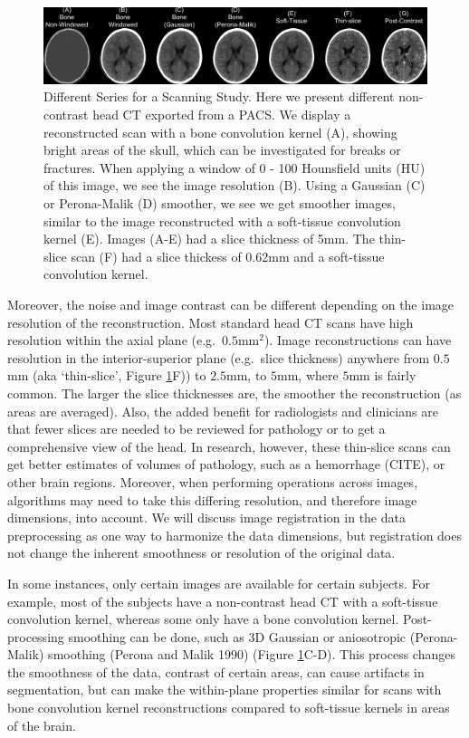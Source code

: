 \documentclass[]{elsarticle} %
\begin{document}
\begin{figure}
\includegraphics[width=1\linewidth]{overlaid_slices} \caption{Different Series for a Scanning Study.  Here we present different non-contrast head CT exported from a PACS.  We display a reconstructed scan with a bone convolution kernel (A), showing bright areas of the skull, which can be investigated for breaks or fractures.  When applying a window of 0 - 100 Hounsfield units (HU) of this image, we see the image resolution (B).  Using a Gaussian (C) or Perona-Malik (D) smoother, we see we get smoother images, similar to the image reconstructed with a soft-tissue convolution kernel (E).  Images (A-E) had a slice thickness of 5mm.  The thin-slice scan (F) had a slice thickess of 0.62mm and a soft-tissue convolution kernel.}\label{fig:overlay}
\end{figure}

Moreover, the noise and image contrast can be different depending on the image resolution of the reconstruction. Most standard head CT scans have high resolution within the axial plane (e.g.~\(0.5\)mm\(^2\)). Image reconstructions can have resolution in the interior-superior plane (e.g.~slice thickness) anywhere from \(0.5\)mm (aka `thin-slice', Figure \ref{fig:overlay}F)) to \(2.5\)mm, to \(5\)mm, where \(5\)mm is fairly common. The larger the slice thicknesses are, the smoother the reconstruction (as areas are averaged). Also, the added benefit for radiologists and clinicians are that fewer slices are needed to be reviewed for pathology or to get a comprehensive view of the head. In research, however, these thin-slice scans can get better estimates of volumes of pathology, such as a hemorrhage (CITE), or other brain regions. Moreover, when performing operations across images, algorithms may need to take this differing resolution, and therefore image dimensions, into account. We will discuss image registration in the data preprocessing as one way to harmonize the data dimensions, but registration does not change the inherent smoothness or resolution of the original data.

In some instances, only certain images are available for certain subjects. For example, most of the subjects have a non-contrast head CT with a soft-tissue convolution kernel, whereas some only have a bone convolution kernel. Post-processing smoothing can be done, such as 3D Gaussian or aniosotropic (Perona-Malik) smoothing (Perona and Malik 1990) (Figure \ref{fig:overlay}C-D). This process changes the smoothness of the data, contrast of certain areas, can cause artifacts in segmentation, but can make the within-plane properties similar for scans with bone convolution kernel reconstructions compared to soft-tissue kernels in areas of the brain.
\end{document}
